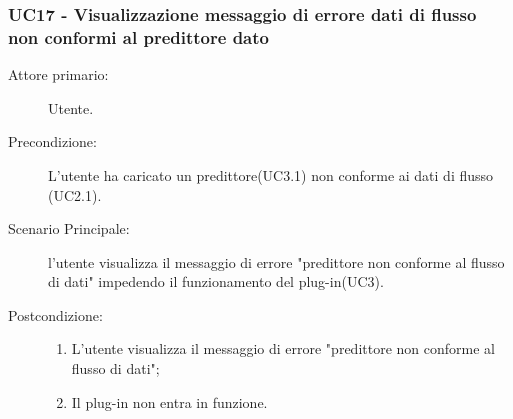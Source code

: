 \subsubsection{UC17 - Visualizzazione messaggio di errore dati di flusso non conformi al predittore dato}
\label{sssec:uc17}
\begin{description}
	\item[Attore primario:] Utente.
	\item[Precondizione:] L'utente ha caricato un predittore(UC3.1) non conforme ai dati di flusso (UC2.1).	
	\item[Scenario Principale:] l'utente visualizza il messaggio di errore "predittore non conforme al flusso di dati" impedendo il funzionamento del plug-in(UC3).
	\item[Postcondizione:]
	\begin{enumerate}		
		\item L'utente visualizza il messaggio di errore "predittore non conforme al flusso di dati";
		\item Il plug-in non entra in funzione.
	\end{enumerate}	
\end{description}